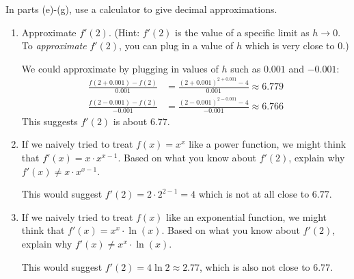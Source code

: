 \documentclass{article}
\begin{document}
\begin{enumerate}
In parts (e)-(g), use a calculator to give decimal approximations.

\begin{enumerate}[resume]
  \item
\begin{problem}[\vfill]
      Approximate $f'(2)$.  (Hint: $f'(2)$ is the value of a specific limit as $h \to 0$. To \emph{approximate} $f'(2)$, you can plug
      in a value of $h$ which is very close to $0$.)
    \end{problem}

    \begin{solution} %
      We could approximate by plugging in values of $h$ such as $0.001$
      and $-0.001$: 
      \begin{align*}
        \frac{f(2 + 0.001) - f(2)}{0.001} &= \frac{(2 + 0.001)^{2 +
            0.001} - 4}{0.001} %
        \approx 6.779 \\
        \frac{f(2 - 0.001) - f(2)}{-0.001} &= \frac{(2 - 0.001)^{2 -
            0.001} - 4}{-0.001} %
        \approx 6.766 
      \end{align*}
      This suggests $f'(2)$ is about $6.77$.
    \end{solution}

  \item
    \begin{problem}[\vfill]
      If we naively tried to treat $f(x)=x^x$ like a power function, we
      might think that $f'(x) = x\cdot x^{x-1}$.  Based on what you know about $f'(2)$, explain why $f'(x)\neq x\cdot x^{x-1}$.
    \end{problem}

    \begin{solution} %
      This would suggest $f'(2) = 2 \cdot 2^{2 - 1} = 4$ which is not
      at all close to $6.77$.
    \end{solution}

  \item
    \begin{problem}[\vfill]
      If we naively tried to treat $f(x)$ like an exponential function, we might think that $f'(x) = x^{x} \cdot \ln(x)$.  Based on what you know about $f'(2)$, explain why $f'(x)\neq x^x \cdot
      \ln(x)$.
    \end{problem}

    \begin{solution} %
      This would suggest $f'(2) = 4 \ln 2 \approx 2.77$, which is also
      not close to $6.77$.
    \end{solution}

  \end{enumerate}

\end{enumerate}



\end{document}
